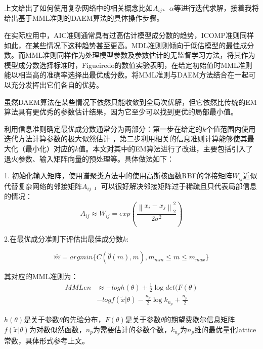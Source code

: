 \documentclass[a4paper,12pt,openany,oneside,utf-8]{ctexbook}
\begin{document}
    上文给出了如何使用复杂网络中的相关概念比如$A_{i j}$、$\alpha$等进行迭代求解，接着我将给出基于MML准则的DAEM算法的具体操作步骤。
    
    在实际应用中，AIC准则通常具有过高估计模型成分数的趋势，ICOMP准则同样如此，在某些情况下这种趋势甚至更高。MDL准则则倾向于低估模型的最佳成分数。而MML准则同样作为处理模型参数及参数估计的无监督学习方法，将其作为模型成分数选择标准时，Figueiredo的数值实验表明，在给定初始值时MML准则能以相当高的准确率选择出最优成分数。将MML准则与DAEM方法结合在一起可以充分发挥出它们各自的优势。
	
	
	
	虽然DAEM算法在某些情况下依然只能收敛到全局次优解，但它依然比传统的EM算法具有更优秀的参数估计结果，因为它至少可以找到更优的局部最小值。
    
    利用信息准则确定最优成分数通常分为两部分：第一步在给定的$k$个值范围内使用迭代方法计算参数的极大似然估计 ，第二步利用相关的信息准则计算能够使其最大化（最小化）对应的$k$值。本文对其中的EM算法进行了改进，主要包括引入了退火参数、输入矩阵向量的预处理等。具体做法如下：
    
    1.	初始化输入矩阵，使用谱聚类方法中的使用高斯核函数RBF的邻接矩阵$W_{i j}$近似代替复杂网络的邻接矩阵$A_{i j}$ ，可以很好解决邻接矩阵过于稀疏且只代表局部信息的情况：
    \begin{equation}
        A_{i j}\approx W_{i j}=exp(\frac{\left \| x_i-x_j\right \|^2_2}{2\sigma^2})
    \end{equation}
    
    2.在最优成分准则下评估出最佳成分数$k$:
	
	\begin{equation}
	    \hat{m}=arg min\{C(\hat{\theta}(m),m),m_{min}\leq m\leq m_{max}\}
	\end{equation}
	
	其对应的MML准则为：
	\begin{equation}\label{eq19}
	\begin{aligned}
       MMLen &\approx -logh(\theta)+\frac{1}{2}\log det(F(\theta)\\&-logf(\tilde{x}|\theta)-\frac{n_p}{2} \log k_{n_p}+\frac{n_p}{2}
    \end{aligned}
    \end{equation}
    
    $h(\theta)$是关于参数$\theta$的先验分布，$F(\theta)$是关于参数$\theta$的期望费歇尔信息矩阵$f(\tilde{x}|\theta)$为对数似然函数，$n_p$为需要估计的参数个数，$k_{n_p}$为$n_p$维的最优量化lattice常数，具体形式参考上文。
    
\end{document}
